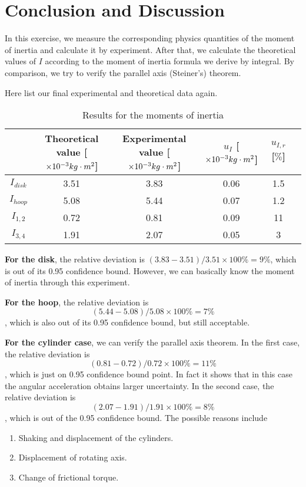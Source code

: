 \section{Conclusion and Discussion}
    In this exercise, we measure the corresponding physics quantities of the moment of inertia and calculate it by experiment. After that, we calculate the theoretical values of $I$ according to the moment of inertia formula we derive by integral. By comparison, we try to verify the parallel axis (Steiner's) theorem.

    Here list our final experimental and theoretical data again.
    
    \begin{table}[H] \small
        \centering
        \begin{tabular}{|c|c|c|c|c|c|}
            \hline
            & Theoretical value [$\times10^{-3}kg\cdot m^2$] & Experimental value [$\times10^{-3}kg\cdot m^2$] & $u_I$ [$\times10^{-3}kg\cdot m^2$] & $u_{I,r}$ [$\%$]\\\hline
            $I_{disk}$ & 3.51 & 3.83 & 0.06 & 1.5\\\hline
            $I_{hoop}$ & 5.08 & 5.44 & 0.07 & 1.2\\\hline
            $I_{1,2}$ & 0.72 & 0.81 & 0.09 & 11\\\hline
            $I_{3,4}$ & 1.91 & 2.07 & 0.05 & 3\\\hline
        \end{tabular}
        \caption{Results for the moments of inertia}\label{data_i}
    \end{table}
    
    \textbf{For the disk}, the relative deviation is $(3.83-3.51)/3.51\times100\%=9\%$, which is out of its 0.95 confidence bound. However, we can basically know the moment of inertia through this experiment.

    \textbf{For the hoop}, the relative deviation is $$(5.44-5.08)/5.08\times100\%=7\%$$, which is also out of its 0.95 confidence bound, but still acceptable.

    \textbf{For the cylinder case}, we can verify the parallel axis theorem. In the first case, the relative deviation is $$(0.81-0.72)/0.72\times100\%=11\%$$, which is just on 0.95 confidence bound point. In fact it shows that in this case the angular acceleration obtains larger uncertainty. In the second case, the relative deviation is $$(2.07-1.91)/1.91\times100\%=8\%$$, which is out of the 0.95 confidence bound. The possible reasons include
    \begin{enumerate}
        \item Shaking and displacement of the cylinders.
        \item Displacement of rotating axis.
        \item Change of frictional torque.
    \end{enumerate}

